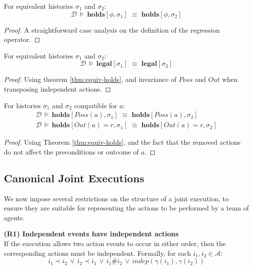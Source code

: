 \begin{thm}
\label{thm:equiv-holds}For equivalent histories $\sigma_{1}$ and
$\sigma_{2}$:\[
\mathcal{D}\,\models\,\mathbf{holds}[\phi,\sigma_{1}]\,\,\equiv\,\,\mathbf{holds}[\phi,\sigma_{2}]\]

\end{thm}
\begin{proof}
A straightforward case analysis on the definition of the regression
operator. 
\end{proof}
\begin{thm}
\label{thm:equiv-legal}For equivalent histories $\sigma_{1}$ and
$\sigma_{2}$:\[
\mathcal{D}\,\models\,\mathbf{legal}[\sigma_{1}]\,\,\equiv\,\,\mathbf{legal}[\sigma_{2}]\]

\end{thm}
\begin{proof}
Using theorem \ref{thm:equiv-holds}, and invariance of $Poss$ and
$Out$ when transposing independent actions. 
\end{proof}
\begin{thm}
\label{thm:equiv-compat}For histories $\sigma_{1}$ and $\sigma_{2}$
compatible for $a$:\begin{gather*}
\mathcal{D}\,\models\,\mathbf{holds}[Poss(a),\sigma_{1}]\,\,\equiv\,\,\mathbf{holds}[Poss(a),\sigma_{2}]\\
\mathcal{D}\,\models\,\mathbf{holds}[Out(a)=r,\sigma_{1}]\,\,\equiv\,\,\mathbf{holds}[Out(a)=r,\sigma_{2}]\end{gather*}

\end{thm}
\begin{proof}
Using Theorem \ref{thm:equiv-holds}, and the fact that the removed
actions do not affect the preconditions or outcome of $a$. 
\end{proof}

\subsection{Canonical Joint Executions}

We now impose several restrictions on the structure of a joint execution,
to ensure they are suitable for representing the actions to be performed
by a team of agents.

\textbf{(R1) Independent events have independent actions}\\
 If the execution allows two action events to occur in either order,
then the corresponding actions must be independent. Formally, for
each $i_{1},i_{2}\in\mathcal{A}$:\[
i_{1}\prec i_{2}\,\vee\, i_{2}\prec i_{1}\,\vee\, i_{1}\#i_{2}\,\vee\, indep(\gamma(i_{1}),\gamma(i_{2}))\]



